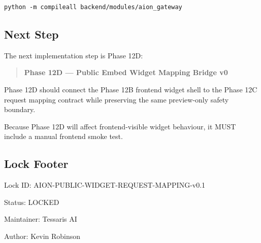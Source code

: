 \begin{verbatim}
python -m compileall backend/modules/aion_gateway
\end{verbatim}

\subsection{Next Step}

The next implementation step is Phase 12D:

\begin{quote}
\textbf{Phase 12D --- Public Embed Widget Mapping Bridge v0}
\end{quote}

Phase 12D should connect the Phase 12B frontend widget shell to the Phase 12C request mapping contract while preserving the same preview-only safety boundary.

Because Phase 12D will affect frontend-visible widget behaviour, it MUST include a manual frontend smoke test.

\subsection{Lock Footer}

Lock ID: AION-PUBLIC-WIDGET-REQUEST-MAPPING-v0.1

Status: LOCKED

Maintainer: Tessaris AI

Author: Kevin Robinson
